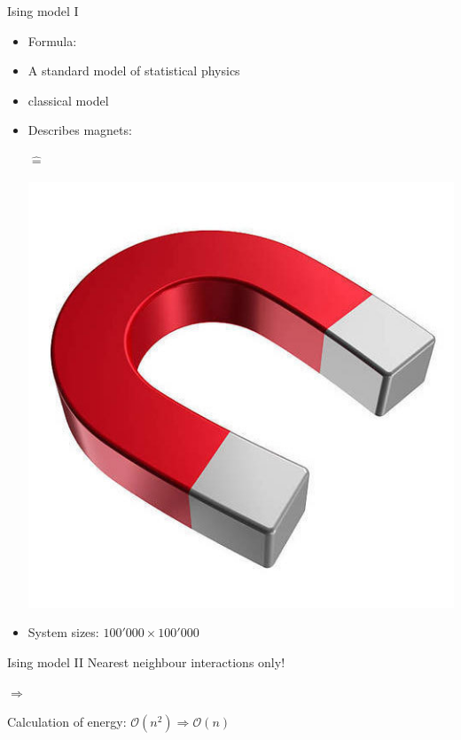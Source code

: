 \documentclass{beamer}
\begin{document}
\begin{frame}{Ising model I}
\begin{itemize}
    \item Formula:
        \ising \pause
    \item A standard model of statistical physics \pause
    \item classical model \pause
    \item Describes magnets:\\
        \begin{minipage}{0.3\paperwidth}\end{minipage}
        \begin{minipage}[c]{0.2\paperwidth} $\mathrel{\widehat{=}}$ \end{minipage}
        \begin{minipage}{0.2\paperwidth}\includegraphics[keepaspectratio=true, width=0.3\paperwidth]{images/magnet.jpg}\end{minipage} \pause
    \item System sizes: $100'000 \times 100'000$
\end{itemize}
\end{frame}

\begin{frame}{Ising model II}
    Nearest neighbour interactions only!
    \ising \pause
    \vspace{1cm}
    \begin{minipage}{0.3\paperwidth}\end{minipage}
    {\Huge$\Rightarrow$}
    \begin{minipage}{0.2\paperwidth}\end{minipage} \pause
    
    Calculation of energy: $\mathcal{O}\left( n^2 \right) \Rightarrow \mathcal{O}\left( n \right)$
\end{frame}
\end{document}
